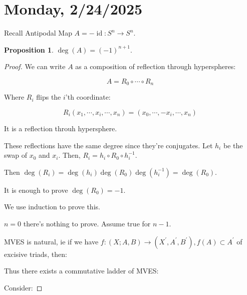 \documentclass{article}
\theoremstyle{definition}
\newtheorem{proposition}[theorem]{Proposition}
\begin{document}
    \section*{Monday, 2/24/2025}
    
    Recall Antipodal Map \(A = - \operatorname{id}: S^n \to S^n\).

    \begin{proposition}
        \(\deg(A) = (-1)^{n+1}\).
    \end{proposition}

    \begin{proof}
        We can write \(A\) as a composition of reflection through hyperspheres:

        \[
            A = R_0 \circ \cdots \circ R_n
        \]

        Where \(R_i\) flips the \(i\)'th coordinate:

        \[
            R_i(x_1, \cdots , x_i, \cdots , x_n) = (x_0, \cdots , -x_i, \cdots , x_n)
        \]

        It is a reflection throuh hypersphere.

        These reflections have the same degree since they're conjugates. Let \(h_i\) be the swap of \(x_0\) and \(x_i\). Then, \(R_i = h_i \circ R_0 \circ h_i ^{-1}\).

        Then \(\deg(R_i) = \deg(h_i) \deg(R_0) \deg(h_i ^{-1}) = \deg(R_0)\).
        
        It is enough to prove \(\deg(R_0)=-1\).

        We use induction to prove this. 

        \(n=0\) there's nothing to prove. Assume true for \(n-1\).

        MVES is natural, ie if we have \(f:(X;A,B)\to (X^{\prime},A^{\prime},B^{\prime}), f(A) \subset A^{\prime}\) of excisive triads, then:

        Thus there exists a commutative ladder of MVES:

        \begin{center}
        \end{center}

        Consider:


\end{proof}
\end{document}
